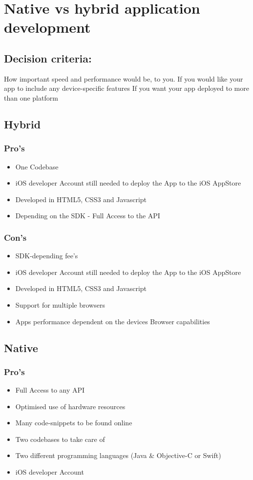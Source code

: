 \documentclass[12pt]{article}
\begin{document}
\section{Native vs hybrid application development}

\subsection{Decision criteria:}
How important speed and performance would be, to you.
If you would like your app to include any device-specific features
If you want your app deployed to more than one platform


\subsection{Hybrid}
\subsubsection{Pro's}
\begin{itemize}
\item One Codebase
\item iOS developer Account still needed to deploy the App to the iOS AppStore
\item Developed in HTML5, CSS3 and Javascript
\item Depending on the SDK - Full Access to the API
\end{itemize}

\subsubsection{Con's }
\begin{itemize}
\item SDK-depending fee's
\item iOS developer Account still needed to deploy the App to the iOS AppStore
\item Developed in HTML5, CSS3 and Javascript
\item Support for multiple browsers
\item Apps performance dependent on the devices Browser capabilities
\end{itemize}

\subsection{Native}

\subsubsection{Pro's}
\begin{itemize}
\item Full Access to any API
\item Optimised use of hardware resources
\item Many code-snippets to be found online
\end{itemize}

\begin{itemize}
\item Two codebases to take care of
\item Two different programming languages (Java \& Objective-C or Swift)
\item iOS developer Account
\end{itemize}
\end{document}
